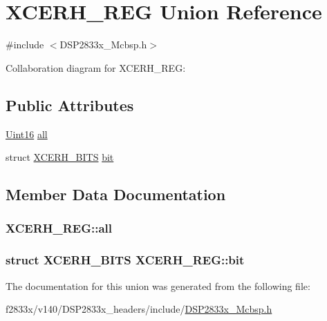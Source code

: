 \hypertarget{union_x_c_e_r_h___r_e_g}{}\section{X\+C\+E\+R\+H\+\_\+\+R\+E\+G Union Reference}
\label{union_x_c_e_r_h___r_e_g}


{\ttfamily \#include $<$D\+S\+P2833x\+\_\+\+Mcbsp.\+h$>$}



Collaboration diagram for X\+C\+E\+R\+H\+\_\+\+R\+E\+G\+:
\subsection*{Public Attributes}
\begin{DoxyCompactItemize}
\item 
\hyperlink{_d_s_p2833x___device_8h_a59a9f6be4562c327cbfb4f7e8e18f08b}{Uint16} \hyperlink{union_x_c_e_r_h___r_e_g_a4687845f4c831eab1d2be4b8ab34ad12}{all}
\item 
struct \hyperlink{struct_x_c_e_r_h___b_i_t_s}{X\+C\+E\+R\+H\+\_\+\+B\+I\+T\+S} \hyperlink{union_x_c_e_r_h___r_e_g_aa746273ffcda50838b8063e723beb40a}{bit}
\end{DoxyCompactItemize}


\subsection{Member Data Documentation}
\hypertarget{union_x_c_e_r_h___r_e_g_a4687845f4c831eab1d2be4b8ab34ad12}{}
\subsubsection[{all}]{ X\+C\+E\+R\+H\+\_\+\+R\+E\+G\+::all}\label{union_x_c_e_r_h___r_e_g_a4687845f4c831eab1d2be4b8ab34ad12}
\hypertarget{union_x_c_e_r_h___r_e_g_aa746273ffcda50838b8063e723beb40a}{}
\subsubsection[{bit}]{\setlength{\rightskip}{0pt plus 5cm}struct {\bf X\+C\+E\+R\+H\+\_\+\+B\+I\+T\+S} X\+C\+E\+R\+H\+\_\+\+R\+E\+G\+::bit}\label{union_x_c_e_r_h___r_e_g_aa746273ffcda50838b8063e723beb40a}


The documentation for this union was generated from the following file\+:\begin{DoxyCompactItemize}
\item 
f2833x/v140/\+D\+S\+P2833x\+\_\+headers/include/\hyperlink{_d_s_p2833x___mcbsp_8h}{D\+S\+P2833x\+\_\+\+Mcbsp.\+h}\end{DoxyCompactItemize}
